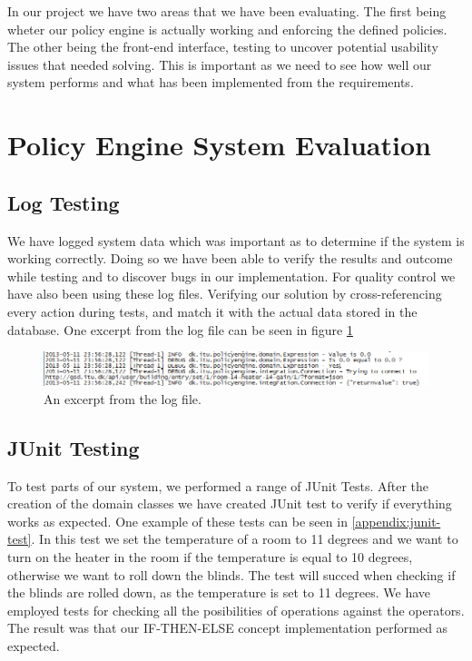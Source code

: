 In our project we have two areas that we have been evaluating. The first being wheter our policy engine is actually working and enforcing the defined policies. The other being the front-end interface, testing to uncover potential usability issues that needed solving.
This is important as we need to see how well our system performs and what has been implemented from the requirements.
\section{Policy Engine System Evaluation}
\label{policy-engine-system-evaluation}

\subsection{Log Testing}
\label{log-test}
We have logged system data which was important as to determine if the system is working correctly. Doing so we have been able to verify the results and outcome while testing and to discover bugs in our implementation.
For quality control we have also been using these log files. Verifying our solution by cross-referencing every action during tests, and match it with the actual data stored in the database.
One excerpt from the log file can be seen in figure \ref{fig:log}

\begin{figure}[ht]
\centering
\includegraphics[width=\columnwidth]{images/logoutput.png}
\caption{An excerpt from the log file.}
\label{fig:log}
\end{figure}

\subsection{JUnit Testing}
To test parts of our system, we performed a range of JUnit Tests. After the creation of the domain classes we have created JUnit test to verify if everything works as expected. 
One example of these tests can be seen in \ref{appendix:junit-test}. In this test we set the temperature of a room to 11 degrees and we want to turn on the heater in the room if the temperature is equal to 10 degrees, otherwise we want to roll down the blinds. The test will succed when checking if the blinds are rolled down, as the temperature is set to 11 degrees. 
We have employed tests for checking all the posibilities of operations against the operators. 
The result was that our IF-THEN-ELSE concept implementation performed as expected. 

